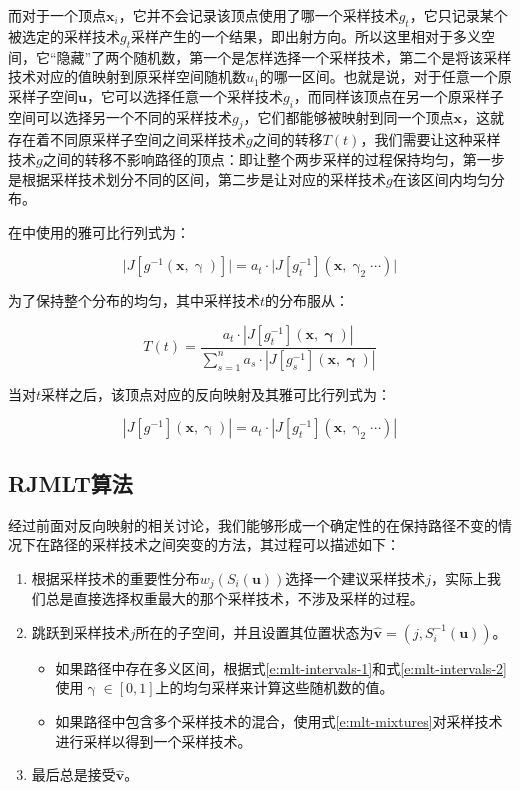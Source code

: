 而对于一个顶点$\mathbf{x}_i$，它并不会记录该顶点使用了哪一个采样技术$g_t$，它只记录某个被选定的采样技术$g_t$采样产生的一个结果，即出射方向。所以这里相对于多义空间，它“隐藏”了两个随机数，第一个是怎样选择一个采样技术，第二个是将该采样技术对应的值映射到原采样空间随机数$u_1$的哪一区间。也就是说，对于任意一个原采样子空间$\mathbf{u}$，它可以选择任意一个采样技术$g_i$，而同样该顶点在另一个原采样子空间可以选择另一个不同的采样技术$g_j$，它们都能够被映射到同一个顶点$\mathbf{x}$，这就存在着不同原采样子空间之间采样技术$g$之间的转移$T(t)$，我们需要让这种采样技术$g$之间的转移不影响路径的顶点：即让整个两步采样的过程保持均匀，第一步是根据采样技术划分不同的区间，第二步是让对应的采样技术$g$在该区间内均匀分布。

在\cite{a:ReversibleJumpMetropolisLightTransportusingInverseMappings}中使用的雅可比行列式为：

\begin{equation}
	\big|J[g^{-1}({\mathbf{x}},{\upgamma})]\big|=a_t\cdot\big|J[g^{-1}_t]({\mathbf{x}},{\upgamma}_2\cdots)\big|
\end{equation}

\noindent 为了保持整个分布的均匀，其中采样技术$t$的分布服从：

\begin{equation}\label{e:mlt-mixtures}
	T(t)=\frac{a_t\cdot|J[g^{-1}_t]({\mathbf{x}},{\mathbf{\upgamma}})|}{\sum^{n}_{s=1}a_s\cdot|J[g^{-1}_s]({\mathbf{x}},{\mathbf{\upgamma}})|}
\end{equation}

\noindent 当对$t$采样之后，该顶点对应的反向映射及其雅可比行列式为：

\begin{equation}
	|J[g^{-1}]({\mathbf{x}},{\upgamma})|=a_t\cdot|J[g^{-1}_t]({\mathbf{x}},\upgamma_2\cdots)|
\end{equation}




\subsection{RJMLT算法}
经过前面对反向映射的相关讨论，我们能够形成一个确定性的在保持路径不变的情况下在路径的采样技术之间突变的方法，其过程可以描述如下：

\begin{enumerate}
	\item 根据采样技术的重要性分布$w_j(S_i({\mathbf{u}}))$选择一个建议采样技术$j$，实际上我们总是直接选择权重最大的那个采样技术，不涉及采样的过程。
	\item 跳跃到采样技术$j$所在的子空间，并且设置其位置状态为$\hat{\mathbf{v}}=(j,S^{-1}_i({\mathbf{u}}))$。
	\begin{itemize}
		\item 如果路径中存在多义区间，根据式\ref{e:mlt-intervals-1}和式\ref{e:mlt-intervals-2}使用$\upgamma\in[0,1]$上的均匀采样来计算这些随机数的值。
		\item 如果路径中包含多个采样技术的混合，使用式\ref{e:mlt-mixtures}对采样技术进行采样以得到一个采样技术。
	\end{itemize}
	
	\item 最后总是接受$\hat{\mathbf{v}}$。
\end{enumerate}

